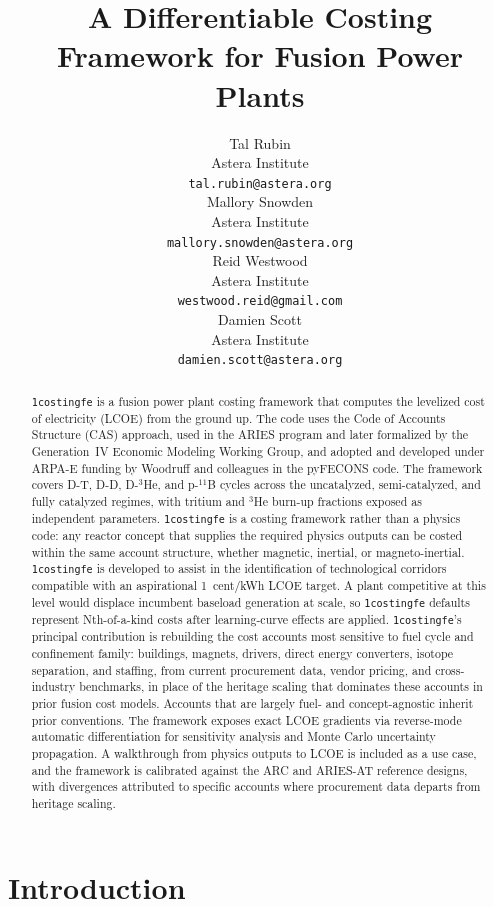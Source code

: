 \documentclass{article}
\title{A Differentiable Costing Framework for Fusion Power Plants}
\author{
	Tal Rubin \\
	Astera Institute \\
	\texttt{tal.rubin@astera.org} \\
	\And
	Mallory Snowden \\
	Astera Institute \\
	\texttt{mallory.snowden@astera.org} \\
	\And
	Reid Westwood \\
	Astera Institute \\
	\texttt{westwood.reid@gmail.com} \\
	\And
	Damien Scott \\
	Astera Institute \\
	\texttt{damien.scott@astera.org} \\
}
\begin{document}
\maketitle

\begin{abstract}
\texttt{1costingfe} is a fusion power plant costing framework that
computes the levelized cost of electricity (LCOE) from the ground up.
The code uses the Code of Accounts Structure (CAS) approach, used in
the ARIES program and later formalized by the Generation~IV Economic
Modeling Working Group, and adopted and developed under ARPA-E funding
by Woodruff and colleagues in the pyFECONS code.
The framework covers D-T, D-D, D-${}^3$He, and p-${}^{11}$B
cycles across the uncatalyzed, semi-catalyzed, and fully catalyzed
regimes, with tritium and ${}^3$He burn-up fractions exposed as
independent parameters. \texttt{1costingfe} is a costing
framework rather than a physics code: any reactor concept that
supplies the required physics outputs can be costed within the
same account structure, whether magnetic, inertial, or
magneto-inertial.
\texttt{1costingfe} is developed to assist in the identification 
of technological corridors compatible with an aspirational 1~cent/kWh 
LCOE target. A plant competitive at this level would displace incumbent 
baseload generation at scale, so \texttt{1costingfe} defaults represent 
Nth-of-a-kind costs after learning-curve effects are applied.
\texttt{1costingfe}'s principal contribution is rebuilding the cost
accounts most sensitive to fuel cycle and confinement family:
buildings, magnets, drivers, direct energy converters, isotope
separation, and staffing, from current procurement data, vendor
pricing, and cross-industry benchmarks, in place of the heritage
scaling that dominates these accounts in prior fusion cost models.
Accounts that are largely fuel- and concept-agnostic inherit prior
conventions. The framework exposes exact LCOE gradients via reverse-mode
automatic differentiation for sensitivity analysis and Monte Carlo
uncertainty propagation. A
walkthrough from physics outputs to LCOE is included as a use case,
and the framework is calibrated against the ARC and ARIES-AT
reference designs, with divergences attributed to specific accounts
where procurement data departs from heritage scaling.
\end{abstract}



\section{Introduction}
\label{sec:intro}
\end{document}
